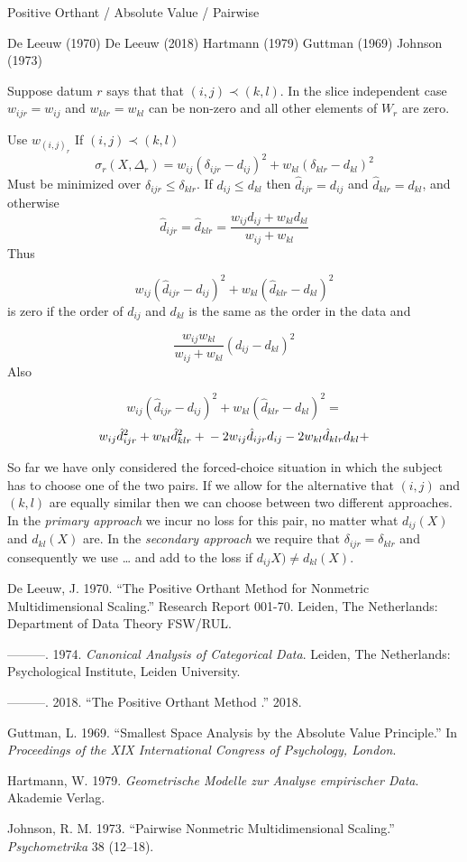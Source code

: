 \documentclass[
  12pt,
]{article}
\newlength{\cslhangindent}
\newenvironment{CSLReferences}[2] %
 {\begin{list}{}{%
  \setlength{\itemindent}{0pt}
  \setlength{\leftmargin}{0pt}
  \setlength{\parsep}{0pt}
  \ifodd #1
   \setlength{\leftmargin}{\cslhangindent}
   \setlength{\itemindent}{-1\cslhangindent}
  \fi
  \setlength{\itemsep}{#2\baselineskip}}}
 {\end{list}}
\begin{document}
Positive Orthant / Absolute Value / Pairwise

De Leeuw (1970)
De Leeuw (2018)
Hartmann (1979)
Guttman (1969)
Johnson (1973)

Suppose datum \(r\) says that that \((i,j)\prec(k,l)\). In the slice independent case \(w_{ijr}=w_{ij}\) and \(w_{klr}=w_{kl}\)
can be non-zero and all other elements of \(W_r\) are zero.

Use \(w_{(i,j)_r}\)
If \((i,j)\prec(k,l)\)
\[
\sigma_r(X,\Delta_r)=w_{ij}(\delta_{ijr}-d_{ij})^2+w_{kl}(\delta_{klr}-d_{kl})^2
\]
Must be minimized over \(\delta_{ijr}\leq\delta_{klr}\). If \(d_{ij}\leq d_{kl}\)
then \(\hat d_{ijr}=d_{ij}\) and \(\hat d_{klr}=d_{kl}\), and otherwise
\[
\hat d_{ijr}=\hat d_{klr}=\frac{w_{ij}d_{ij}+w_{kl}d_{kl}}{w_{ij}+w_{kl}}
\]
Thus

\[w_{ij}(\hat d_{ijr}-d_{ij})^2+w_{kl}(\hat d_{klr}-d_{kl})^2\]
is zero if the order of \(d_{ij}\) and \(d_{kl}\) is the same as the order in the data
and

\[
\frac{w_{ij}w_{kl}}{w_{ij}+w_{kl}}(d_{ij}-d_{kl})^2
\]
Also

\[w_{ij}(\hat d_{ijr}-d_{ij})^2+w_{kl}(\hat d_{klr}-d_{kl})^2=\]
\[
w_{ij}\hat d_{ijr}^2+w_{kl}\hat d_{klr}^2+\\
-2w_{ij}\hat d_{ijr}d_{ij}-2w_{kl}\hat d_{klr}d_{kl}+
\]

So far we have only considered the forced-choice situation in which
the subject has to choose one of the two pairs. If we allow for the alternative that \((i,j)\) and \((k,l)\) are equally similar then we can choose between two different approaches. In the \emph{primary approach} we incur no loss for this pair, no matter what \(d_{ij}(X)\) and \(d_{kl}(X)\) are. In the \emph{secondary approach} we require that \(\delta_{ijr}=\delta_{klr}\) and consequently we use \ldots{} and add to the loss if
\(d_{ij}X)\not= d_{kl}(X)\).

\label{refs}
\begin{CSLReferences}{1}{0}
De Leeuw, J. 1970. {``The Positive Orthant Method for Nonmetric Multidimensional Scaling.''} Research Report 001-70. Leiden, The Netherlands: Department of Data Theory FSW/RUL.

---------. 1974. \emph{Canonical Analysis of Categorical Data}. Leiden, The Netherlands: Psychological Institute, Leiden University.

---------. 2018. {``{The Positive Orthant Method }.''} 2018.

Guttman, L. 1969. {``{Smallest Space Analysis by the Absolute Value Principle}.''} In \emph{{Proceedings of the XIX International Congress of Psychology, London}}.

Hartmann, W. 1979. \emph{{Geometrische Modelle zur Analyse empirischer Data}}. Akademie Verlag.

Johnson, R. M. 1973. {``{Pairwise Nonmetric Multidimensional Scaling}.''} \emph{Psychometrika} 38 (12--18).

\end{CSLReferences}
\end{document}
